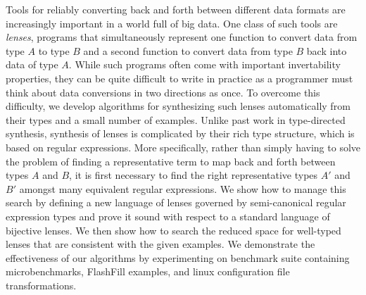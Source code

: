 Tools for reliably converting back and forth between different data
formats are increasingly important in a world full of big data.
One class of such tools are \emph{lenses}, programs that simultaneously
represent one function to convert data from type $A$ to type $B$ and a
second function to convert data from type $B$ back into data of type
$A$.  While such programs often come with important invertability properties,
they can be quite difficult to write in practice 
as a programmer must think about data conversions in two directions as once.
To overcome this difficulty, we develop algorithms for synthesizing such lenses 
automatically from their types and a small number of examples.
Unlike past work in type-directed synthesis, synthesis of lenses is
complicated by their rich type structure, which is based on regular
expressions.  More specifically, rather than simply having to solve
the problem of finding a representative term to map back and forth
between types $A$ and $B$, it is first necessary to find the right
representative types $A'$ and $B'$ amongst many equivalent regular expressions.
We show how to manage this search by defining a new language of
lenses governed by semi-canonical regular expression types and prove it
sound with respect to a standard language of bijective lenses.  We then show
how to search the reduced space for well-typed lenses that are consistent
with the given examples.  We demonstrate the effectiveness of our algorithms
by experimenting on benchmark suite containing microbenchmarks, FlashFill
examples, and linux configuration file transformations.



